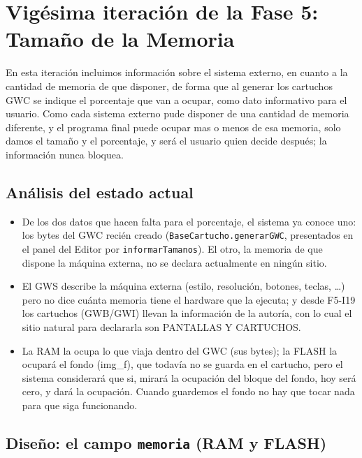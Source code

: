\section{Vigésima iteración de la Fase 5: Tamaño de la Memoria}
\label{sec:F5I20}

En esta iteración incluimos información sobre el sistema externo, en cuanto a la cantidad de memoria de que disponer, de forma que al generar los cartuchos GWC se indique el porcentaje que van a ocupar, como dato informativo para el usuario. Como cada sistema externo pude disponer de una cantidad de memoria diferente, y el programa final puede ocupar mas o menos de esa memoria, solo damos el tamaño y el porcentaje, y será el usuario quien decide después; la información nunca bloquea.

\subsection{Análisis del estado actual}
\label{sec:F5I20Analisis}

\begin{itemize}
	\item De los dos datos que hacen falta para el porcentaje, el sistema ya
	conoce uno: los bytes del GWC recién creado
	(\texttt{BaseCartucho.generarGWC}, presentados en el panel del Editor por
	\texttt{informarTamanos}). El otro, la memoria de que dispone la máquina
	externa, no se declara actualmente en ningún sitio.
	\item El GWS describe la máquina externa (estilo, resolución, botones,
	teclas, \ldots) pero no dice cuánta memoria tiene el hardware que la
	ejecuta; y desde F5-I19 los cartuchos (GWB/GWI) llevan la información de
	la autoría, con lo cual el sitio natural para declararla son PANTALLAS Y
	CARTUCHOS.
	\item La RAM la ocupa lo que viaja dentro del GWC (sus bytes); la FLASH la
	ocupará el fondo (img\_f), que todavía no se guarda en el cartucho, pero el sistema considerará que si, mirará la ocupación del bloque del fondo, hoy será cero, y dará la ocupación. Cuando guardemos el fondo no hay que tocar nada para que siga funcionando.
\end{itemize}

\subsection{Diseño: el campo \texttt{memoria} (RAM y FLASH)}
\label{sec:F5I20Diseno}


